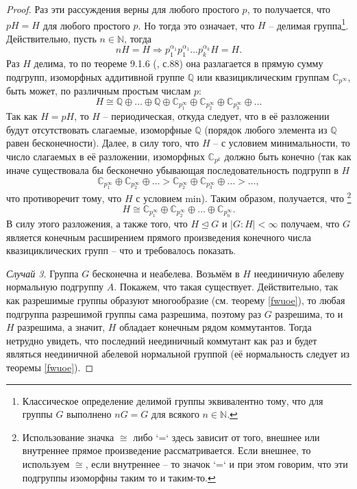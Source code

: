 \documentclass{article}
\begin{document}
\begin{proof}
    Раз эти рассуждения верны для любого простого $p$, то получается, что $pH = H$ для любого простого $p$. Но тогда это означает, что $H$ -- делимая группа\footnote{Классическое определение делимой группы эквивалентно тому, что для группы $G$ выполнено $nG = G$ для всякого $n \in \mathbb{N}$.}. Действительно, пусть $n \in \mathbb{N}$, тогда
    \[
        nH = H \Rightarrow p_1^{\alpha_1} p_1^{\alpha_1} \ldots p_k^{\alpha_k} H = H.
    \]
    Раз $H$ делима, то по теореме 9.1.6 (\cite{kargapolov}, с.88) она разлагается в прямую сумму подгрупп, изоморфных аддитивной группе $\mathbb{Q}$ или квазициклическим группам $\mathbb{C}_{p^\infty}$, быть может, по различным простым числам $p$:
    \[
        H \cong \mathbb{Q} \oplus \ldots \oplus \mathbb{Q} \oplus \mathbb{C}_{p_1^\infty} \oplus \mathbb{C}_{p_2^\infty} \oplus \mathbb{C}_{p_3^\infty} \oplus \ldots
    \]
    Так как $H = pH$, то $H$ -- периодическая, откуда следует, что в её разложении будут отсутствовать слагаемые, изоморфные $\mathbb{Q}$ (порядок любого элемента из $\mathbb{Q}$ равен бесконечности). Далее, в силу того, что $H$ -- с условием минимальности, то число слагаемых в её разложении, изоморфных $\mathbb{C}_{p^k}$ должно быть конечно (так как иначе существовала бы бесконечно убывающая последовательность подгрупп в $H$
    \[
        \mathbb{C}_{p_1^\infty} \oplus \mathbb{C}_{p_2^\infty} \oplus \ldots > \mathbb{C}_{p_2^\infty} \oplus \mathbb{C}_{p_3^\infty} \oplus \ldots > \ldots,
    \]
    что противоречит тому, что $H$ с условием min). Таким образом, получается, что \footnote{Использование значка $\cong$ либо `=` здесь зависит от того, внешнее или внутреннее прямое произведение рассматривается. Если внешнее, то используем $\cong$, если внутреннее -- то значок `=` и при этом говорим, что эти подгруппы изоморфны таким то и таким-то.}
    \[
        H \cong \mathbb{C}_{p_1^\infty} \oplus \mathbb{C}_{p_2^\infty} \oplus \ldots \oplus \mathbb{C}_{p_n^\infty}.
    \]
    В силу этого разложения, а также того, что $H \trianglelefteq G$ и $|G:H| < \infty$ получаем, что $G$ является конечным расширением прямого произведения конечного числа квазициклических групп -- что и требовалось показать.

    \textit{Случай 3.} Группа $G$ бесконечна и неабелева. Возьмём в $H$ неединичную абелеву нормальную подгруппу $A$. Покажем, что такая существует. Действительно, так как разрешимые группы образуют многообразие (см. теорему \ref{fwuoe}), то любая подгруппа разрешимой группы сама разрешима, поэтому раз $G$ разрешима, то и $H$ разрешима, а значит, $H$ обладает конечным рядом коммутантов. Тогда нетрудно увидеть, что последний неединичный коммутант как раз и будет являться неединичной абелевой нормальной группой (её нормальность следует из теоремы \ref{fwuoe}).
    

\end{proof}
\end{document}
